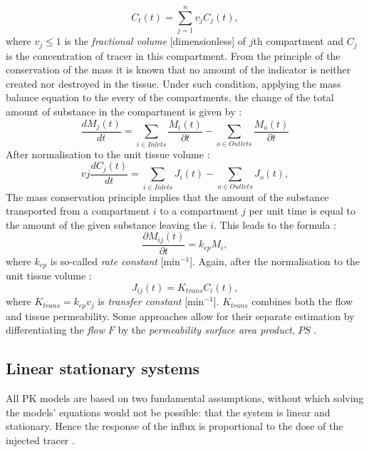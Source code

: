 \begin{equation}
C_t(t) = \sum_{j=1}^{n}v_jC_j(t),
\label{eq:pk3}
\end{equation}
where $v_j\leq1$ is the \textit{fractional volume} [dimensionless] of $j$th compartment and $C_j$ is the concentration of tracer in this compartment. 
From the principle of the conservation of the mass it is known that no amount of the indicator is neither created nor destroyed in the tissue. Under such condition, applying the mass balance equation to the every of the compartments, the change of the total amount of substance in the compartment is given by \cite{thesis}:
\begin{equation}
\frac{dM_j(t)}{dt} = \sum_{i \in Inlets}\frac{M_i(t)}{\partial t}-\sum_{o \in Outlets}\frac{M_o(t)}{\partial t} 
\label{eq:pk4}
\end{equation}
After normalisation to the unit tissue volume \cite{thesis}:
\begin{equation}
vj\frac{dC_j(t)}{dt} = \sum_{i \in Inlets}J_i(t)-\sum_{o \in Outlets}J_o(t) ,
\label{eq:pk5}
\end{equation}
The mass conservation principle implies that the amount of the substance transported from a compartment $i$ to a compartment $j$ per unit time is equal to the amount of the given substance leaving the $i$. This leads to the formula \cite{thesis}:
\begin{equation}
\frac{\partial M_{ij}(t)}{\partial t} = k_{ep}M_i,
\label{eq:pk6}
\end{equation}
where $k_{ep}$ is so-called \textit{rate constant} [min$^{-1}$]. Again, after the normalisation to the unit tissue volume \cite{thesis}:
\begin{equation}
J_{ij}(t) = K_{trans}C_i(t),
\label{eq:pk7}
\end{equation}
where $K_{trans}=k_{ep}v_j$ is \textit{transfer constant} [min$^{-1}$]. $K_{trans}$ combines both the flow and tissue permeability. Some approaches allow for their separate estimation by differentiating the \textit{flow} $F$ by the \textit{permeability surface area product}, $PS$ \cite{thesis}. 

\subsection{Linear stationary systems}
All PK models are based on two fundamental assumptions, without which solving the models' equations would not be possible: that the system is linear and stationary. Hence the response of the influx is proportional to the dose of the injected tracer \cite{thesis, sourbron2011scope}. 

